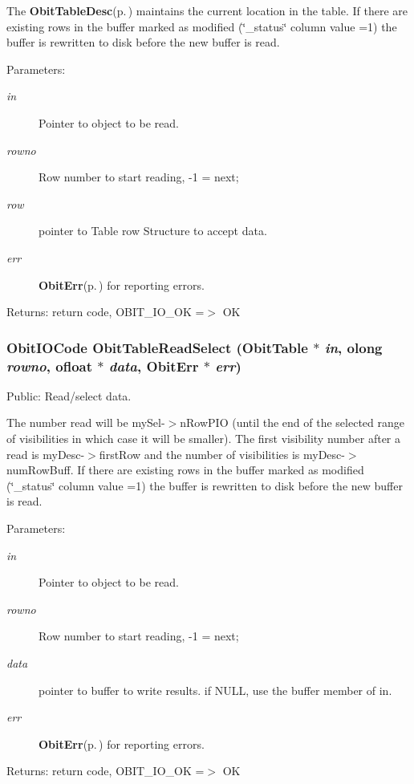 The {\bf Obit\-Table\-Desc}{\rm (p.\,\pageref{structObitTableDesc})} maintains the current location in the table. If there are existing rows in the buffer marked as modified (\char`\"{}\_\-status\char`\"{} column value =1) the buffer is rewritten to disk before the new buffer is read. \begin{Desc}
\item[Parameters:]
\begin{description}
\item[{\em in}]Pointer to object to be read. \item[{\em rowno}]Row number to start reading, -1 = next; \item[{\em row}]pointer to Table row Structure to accept data. \item[{\em err}]{\bf Obit\-Err}{\rm (p.\,\pageref{structObitErr})} for reporting errors. \end{description}
\end{Desc}
\begin{Desc}
\item[Returns:]return code, OBIT\_\-IO\_\-OK =$>$ OK \end{Desc}
\subsubsection{\setlength{\rightskip}{0pt plus 5cm}Obit\-IOCode Obit\-Table\-Read\-Select ({\bf Obit\-Table} $\ast$ {\em in}, {\bf olong} {\em rowno}, {\bf ofloat} $\ast$ {\em data}, {\bf Obit\-Err} $\ast$ {\em err})}\label{ObitTable_8h_a42}


Public: Read/select data. 

The number read will be my\-Sel-$>$n\-Row\-PIO (until the end of the selected range of visibilities in which case it will be smaller). The first visibility number after a read is my\-Desc-$>$first\-Row and the number of visibilities is my\-Desc-$>$num\-Row\-Buff. If there are existing rows in the buffer marked as modified (\char`\"{}\_\-status\char`\"{} column value =1) the buffer is rewritten to disk before the new buffer is read. \begin{Desc}
\item[Parameters:]
\begin{description}
\item[{\em in}]Pointer to object to be read. \item[{\em rowno}]Row number to start reading, -1 = next; \item[{\em data}]pointer to buffer to write results. if NULL, use the buffer member of in. \item[{\em err}]{\bf Obit\-Err}{\rm (p.\,\pageref{structObitErr})} for reporting errors. \end{description}
\end{Desc}
\begin{Desc}
\item[Returns:]return code, OBIT\_\-IO\_\-OK =$>$ OK \end{Desc}
